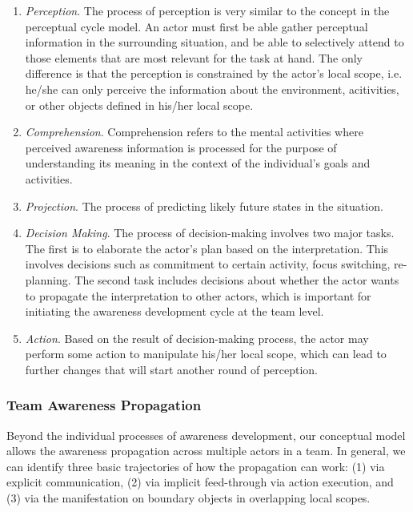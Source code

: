 \begin{enumerate}
	\item \emph{Perception}. The process of perception is very similar to the concept in the perceptual cycle model. An actor must first be able gather perceptual information in the surrounding situation, and be able to selectively attend to those elements that are most relevant for the task at hand. The only difference is that the perception is constrained by the actor's local scope, i.e. he/she can only perceive the information about the environment, acitivities, or other objects defined in his/her local scope.
   \item \emph{Comprehension}. Comprehension refers to the mental activities where perceived awareness information is processed for the purpose of understanding its meaning in the context of the individual's goals and activities.
	\item \emph{Projection}. The process of predicting likely future states in the situation.
	\item \emph{Decision Making}. The process of decision-making involves two major tasks. The first is to elaborate the actor's plan based on the interpretation. This involves decisions such as commitment to certain activity, focus switching, re-planning. The second task includes decisions about whether the actor wants to propagate the interpretation to other actors, which is important for initiating the awareness development cycle at the team level.
	\item \emph{Action}. Based on the result of decision-making process, the actor may perform some action to manipulate his/her local scope, which can lead to further changes that will start another round of perception.
\end{enumerate}


\subsubsection{Team Awareness Propagation} %
\label{ssub:team_processes}
Beyond the individual processes of awareness development, our conceptual model allows the awareness propagation across multiple actors in a team. In general, we can identify three basic trajectories of how the propagation can work: (1) via explicit communication, (2) via implicit feed-through via action execution, and (3) via the manifestation on boundary objects in overlapping local scopes.

